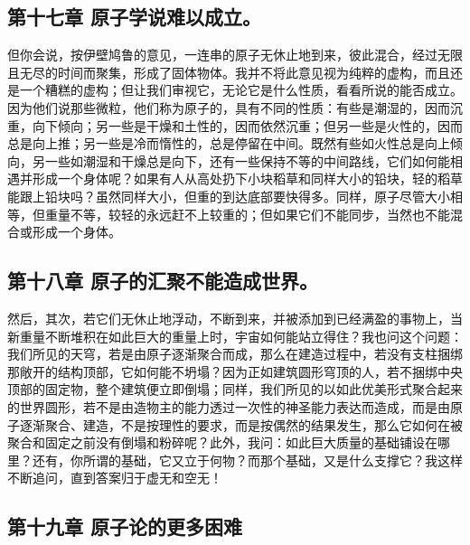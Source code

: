 
\subsection{第十七章 原子学说难以成立。}

但你会说，按伊壁鸠鲁的意见，一连串的原子无休止地到来，彼此混合，经过无限且无尽的时间而聚集，形成了固体物体。我并不将此意见视为纯粹的虚构，而且还是一个糟糕的虚构；但让我们审视它，无论它是什么性质，看看所说的能否成立。因为他们说那些微粒，他们称为原子的，具有不同的性质：有些是潮湿的，因而沉重，向下倾向；另一些是干燥和土性的，因而依然沉重；但另一些是火性的，因而总是向上推；另一些是冷而惰性的，总是停留在中间。既然有些如火性总是向上倾向，另一些如潮湿和干燥总是向下，还有一些保持不等的中间路线，它们如何能相遇并形成一个身体呢？如果有人从高处扔下小块稻草和同样大小的铅块，轻的稻草能跟上铅块吗？虽然同样大小，但重的到达底部要快得多。同样，原子尽管大小相等，但重量不等，较轻的永远赶不上较重的；但如果它们不能同步，当然也不能混合或形成一个身体。\par


\subsection{第十八章 原子的汇聚不能造成世界。}

然后，其次，若它们无休止地浮动，不断到来，并被添加到已经满盈的事物上，当新重量不断堆积在如此巨大的重量上时，宇宙如何能站立得住？我也问这个问题：我们所见的天穹，若是由原子逐渐聚合而成，那么在建造过程中，若没有支柱捆绑那敞开的结构顶部，它如何能不坍塌？因为正如建筑圆形穹顶的人，若不捆绑中央顶部的固定物，整个建筑便立即倒塌；同样，我们所见的以如此优美形式聚合起来的世界圆形，若不是由造物主的能力透过一次性的神圣能力表达而造成，而是由原子逐渐聚合、建造，不是按理性的要求，而是按偶然的结果发生，那么它如何在被聚合和固定之前没有倒塌和粉碎呢？此外，我问：如此巨大质量的基础铺设在哪里？还有，你所谓的基础，它又立于何物？而那个基础，又是什么支撑它？我这样不断追问，直到答案归于虚无和空无！\par


\subsection{第十九章 原子论的更多困难}

